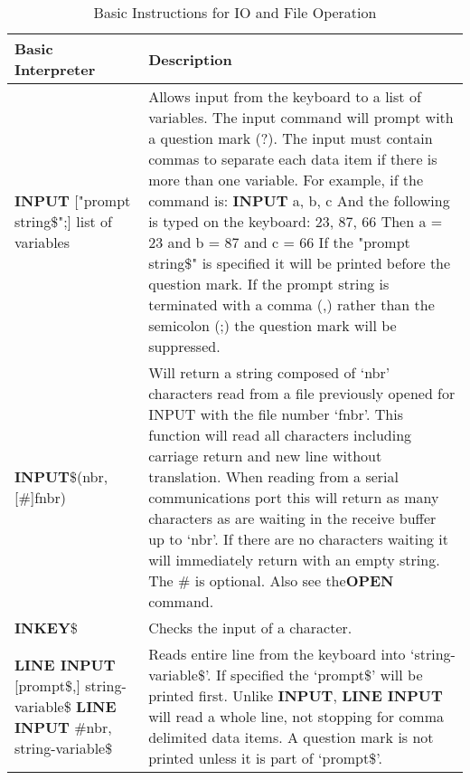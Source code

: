 \begin{table}[]
\centering
\caption{Basic Instructions for IO and File Operation}
\label{Basic_Instructions_for_IO_and_File_Operation}
\begin{tabular}{|p{4cm}|p{10cm}|}
\hline
\textbf{Basic Interpreter} & \textbf{Description}                                                 
\\ \hline
\textbf{INPUT} ["prompt string\$";]
list of variables
& Allows input from the keyboard to a list of variables. The input
command will prompt with a question mark (?).\newline
The input must contain commas to separate each data item if there is
more than one variable.\newline
For example, if the command is:\newline
\textbf{INPUT} a, b, c\newline
And the following is typed on the keyboard: 23, 87, 66\newline
Then a = 23 and b = 87 and c = 66\newline
If the "prompt string\$" is specified it will be printed before the question
mark. If the prompt string is terminated with a comma (,) rather than the
semicolon (;) the question mark will be suppressed.
\\ \hline
\textbf{INPUT}\$(nbr, [\#]fnbr) & Will return a string composed of ‘nbr’ characters read from a file
previously opened for INPUT with the file number ‘fnbr’. This function
will read all characters including carriage return and new line without
translation.\newline
When reading from a serial communications port this will return as
many characters as are waiting in the receive buffer up to ‘nbr’. If there
are no characters waiting it will immediately return with an empty string.\newline
The \# is optional. Also see the\textbf{OPEN} command.
\\ \hline
\textbf{INKEY}\$ & Checks the input of a character.
\\ \hline
\textbf{LINE INPUT} [prompt\$,] string-variable\$\newline
\textbf{LINE INPUT} \#nbr,
string-variable\$
 &  Reads entire line from the keyboard into ‘string-variable\$’. If specified
the ‘prompt\$’ will be printed first. Unlike \textbf{INPUT}, \textbf{LINE INPUT} will
read a whole line, not stopping for comma delimited data items.
A question mark is not printed unless it is part of ‘prompt\$’.
\\ \hline

\end{tabular}
\end{table}
